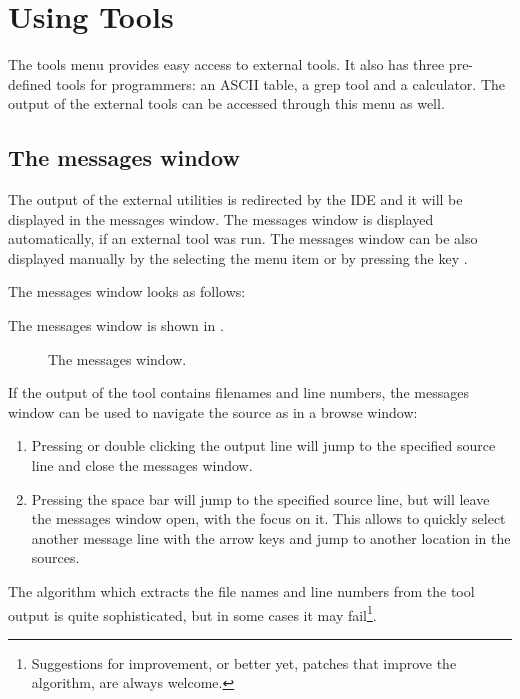 \section{Using Tools}
\label{se:toolsmenu}
The tools menu provides easy access to external tools. It also has
three pre-defined tools for programmers: an ASCII table,  a grep tool
and a calculator. The output of the external tools can be accessed through
this menu as well.

%
%
\subsection{The messages window}
\label{se:toolsmessages}
The output of the external utilities is redirected by the IDE and it
will be displayed in the messages window. The messages window is
displayed automatically, if an external tool was run. The
messages window can be also displayed manually by the selecting the
menu item  or by pressing the key .

\begin{htmlonly}
The messages window looks as follows:
\end{htmlonly}
\begin{latexonly}
The messages window is shown in .
\begin{figure}[ht]
\caption{The messages window.}\label{fig:messages}
\ifpdf
{}
\else
{}
\fi
\end{figure}
\end{latexonly}
If the output of the tool contains filenames and line numbers,
the messages window can be used to navigate the source as in a browse
window:
\begin{enumerate}
\item Pressing  or double clicking the output line will jump
to the specified source line and close the messages window.
\item Pressing the space bar will jump to the specified source line, but
will leave the messages window open, with the focus on it. This allows to
quickly select another message line with the arrow keys and jump to 
another location in the sources.
\end{enumerate}
The algorithm which extracts the file names and line numbers from
the tool output is quite sophisticated, but in some cases it may
fail\footnote{Suggestions for improvement, or better yet, patches
that improve the algorithm, are always welcome.}.
%
%
